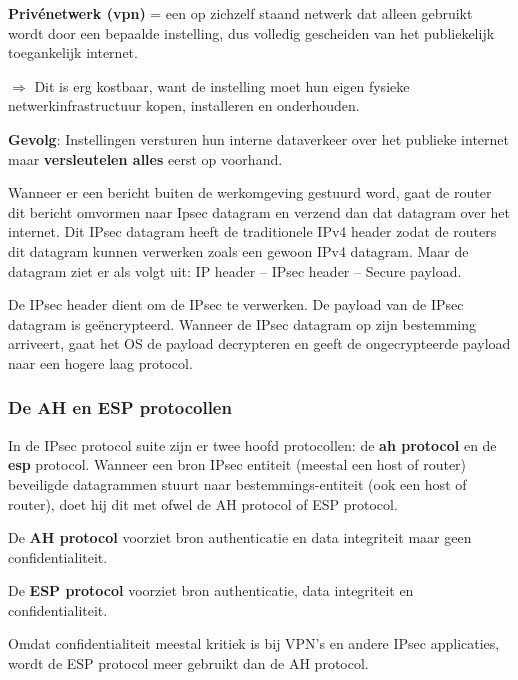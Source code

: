 
\textbf{Privénetwerk (\acrshort{vpn})} = een op zichzelf staand netwerk dat alleen gebruikt wordt door een bepaalde instelling, dus volledig gescheiden van het publiekelijk toegankelijk internet.

\noindent $\Rightarrow$ Dit is erg kostbaar, want de instelling moet hun eigen fysieke netwerkinfrastructuur kopen, installeren en onderhouden.

\noindent \textbf{Gevolg}: Instellingen versturen hun interne dataverkeer over het publieke internet maar \textbf{versleutelen alles} eerst op voorhand.

\noindent Wanneer er een bericht buiten de werkomgeving gestuurd word, gaat de router dit bericht omvormen naar Ipsec datagram en verzend dan dat datagram over het internet. Dit IPsec datagram heeft de traditionele IPv4 header zodat de routers dit datagram kunnen verwerken zoals een gewoon IPv4 datagram. Maar de datagram ziet er als volgt uit: IP header – IPsec header – Secure payload.

\noindent De IPsec header dient om de IPsec te verwerken. De payload van de IPsec datagram is geëncrypteerd. Wanneer de IPsec datagram op zijn bestemming arriveert, gaat het OS de payload decrypteren en geeft de ongecrypteerde payload naar een hogere laag protocol.

\newpage

\subsubsection{De AH en ESP protocollen}

\noindent In de IPsec protocol suite zijn er twee hoofd protocollen: de \textbf{\acrfull{ah} protocol} en de \textbf{\acrfull{esp}} protocol. Wanneer een bron IPsec entiteit (meestal een host of router) beveiligde datagrammen stuurt naar bestemmings-entiteit (ook een host of router), doet hij dit met ofwel de AH protocol of ESP protocol.

\noindent De \textbf{AH protocol} voorziet bron authenticatie en data integriteit maar geen confidentialiteit.

\noindent De \textbf{ESP protocol} voorziet bron authenticatie, data integriteit en confidentialiteit.

\noindent Omdat confidentialiteit meestal kritiek is bij VPN's en andere IPsec applicaties, wordt de ESP protocol meer gebruikt dan de AH protocol.

